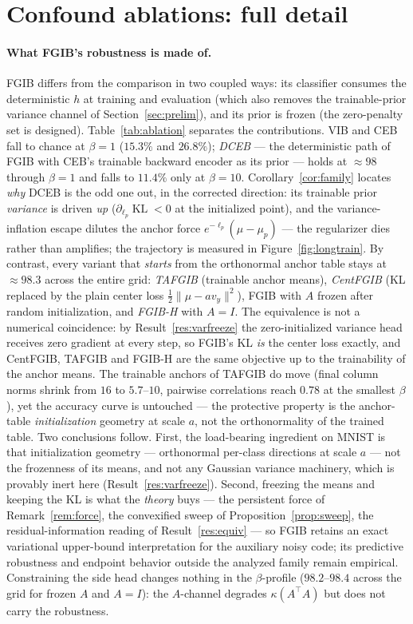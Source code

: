 \documentclass{article} %
\newcommand{\KLd}{\operatorname{KL}}
\begin{document}
\section{Confound ablations: full detail}
\label{app:ablation-detail}

\paragraph{What FGIB's robustness is made of.}
FGIB differs from the comparison in two coupled ways: its classifier consumes the
deterministic $h$ at training and evaluation (which also removes the trainable-prior
variance channel of Section~\ref{sec:prelim}), and its prior is frozen (the zero-penalty
set is designed). Table~\ref{tab:ablation} separates the contributions. VIB and CEB fall
to chance at $\beta=1$ ($15.3\%$ and $26.8\%$); \emph{DCEB} --- the deterministic path
of FGIB with CEB's trainable backward encoder as its prior --- holds at $\approx 98$
through $\beta=1$ and falls to $11.4\%$ only at $\beta=10$.
Corollary~\ref{cor:family} locates \emph{why} DCEB is the odd one out, in the corrected
direction: its trainable prior \emph{variance} is driven \emph{up}
($\partial_{\ell_p}\KLd < 0$ at the initialized point), and the variance-inflation
escape dilutes the anchor force $e^{-\ell_p}(\mu-\mu_p)$ --- the regularizer dies rather
than amplifies; the trajectory is measured in Figure~\ref{fig:longtrain}. By contrast, every
variant that \emph{starts} from the orthonormal anchor table stays at
$\approx 98.3$ across the entire grid: \emph{TAFGIB} (trainable anchor means),
\emph{CentFGIB} (KL replaced by the plain center loss $\tfrac12\|\mu - a v_y\|^2$),
FGIB with $A$ frozen after random initialization, and \emph{FGIB-H} with $A{=}I$. The
equivalence is not a numerical coincidence: by
Result~\ref{res:varfreeze} the zero-initialized variance head receives zero gradient at
every step, so FGIB's KL \emph{is} the center loss exactly, and CentFGIB, TAFGIB and
FGIB-H are the same objective up to the trainability of the anchor means. The trainable
anchors of TAFGIB do move (final column norms shrink from $16$ to
$5.7$--$10$, pairwise correlations reach $0.78$ at the smallest
$\beta$), yet the accuracy curve is untouched --- the
protective property is the anchor-table \emph{initialization} geometry at scale $a$,
not the orthonormality of the trained table. Two conclusions follow. First,
the load-bearing ingredient on MNIST is that initialization geometry ---
orthonormal per-class directions at scale $a$ --- not the frozenness of its means, and
not any Gaussian variance machinery, which is provably inert here
(Result~\ref{res:varfreeze}). Second, freezing the means and keeping the KL
is what the \emph{theory} buys --- the persistent force of Remark~\ref{rem:force}, the
convexified sweep of Proposition~\ref{prop:sweep}, the
residual-information reading of Result~\ref{res:equiv} --- so FGIB retains an exact
variational upper-bound interpretation for the auxiliary noisy code; its predictive
robustness and endpoint behavior outside the analyzed family remain empirical.
Constraining the side head changes nothing in the
$\beta$-profile ($98.2$--$98.4$ across the grid for frozen $A$ and $A{=}I$): the
$A$-channel degrades $\kappa(A^{\top}A)$ but does not carry the robustness.
\end{document}
